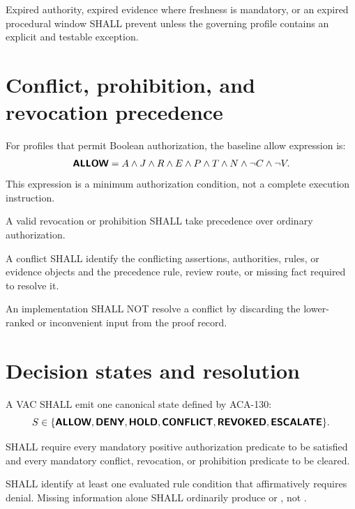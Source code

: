 \begin{requirement}[ACA-120-025]
Expired authority, expired evidence where freshness is mandatory, or an expired
procedural window SHALL prevent  unless the governing profile
contains an explicit and testable exception.
\end{requirement}

\section{Conflict, prohibition, and revocation precedence}
For profiles that permit Boolean authorization, the baseline allow expression
is:
\[
\textsf{\textbf{ALLOW}}=A\land J\land R\land E\land P\land T\land N\land \neg C\land \neg V.
\]
This expression is a minimum authorization condition, not a complete execution
instruction.

\begin{requirement}[ACA-120-026]
A valid revocation or prohibition SHALL take precedence over ordinary
authorization.
\end{requirement}

\begin{requirement}[ACA-120-027]
A conflict SHALL identify the conflicting assertions, authorities, rules, or
evidence objects and the precedence rule, review route, or missing fact required
to resolve it.
\end{requirement}

\begin{requirement}[ACA-120-028]
An implementation SHALL NOT resolve a conflict by discarding the lower-ranked
or inconvenient input from the proof record.
\end{requirement}

\section{Decision states and resolution}
A VAC SHALL emit one canonical state defined by ACA-130:
\[
S\in\{\textsf{\textbf{ALLOW}},\textsf{\textbf{DENY}},\textsf{\textbf{HOLD}},\textsf{\textbf{CONFLICT}},
\textsf{\textbf{REVOKED}},\textsf{\textbf{ESCALATE}}\}.
\]

\begin{requirement}[ACA-120-029]
 SHALL require every mandatory positive authorization predicate to
be satisfied and every mandatory conflict, revocation, or prohibition predicate
to be cleared.
\end{requirement}

\begin{requirement}[ACA-120-030]
 SHALL identify at least one evaluated rule condition that affirmatively
requires denial. Missing information alone SHALL ordinarily produce
 or , not .
\end{requirement}

